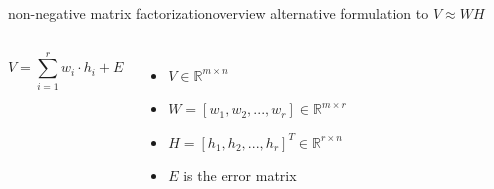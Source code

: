         \begin{frame}{non-negative matrix factorization}{overview}
           alternative formulation to $V \approx WH$
            \begin{columns}
                \begin{equation*}
                V = \sum_{i = 1}^r w_{i} \cdot h_{i} + E
                \end{equation*}
			    \begin{itemize}
					\item  $V \in \mathbb{R}^{m \times n}$
					\item  $W = [w_{1}, w_{2}, ..., w_{r}] \in \mathbb{R}^{m \times r}$
					\item  $H  = [h_{1}, h_{2}, ..., h_{r}]^{T} \in \mathbb{R}^{r \times n}$
					\item  $E$ is the error matrix													   
				\end{itemize}			                   
            \end{columns}
            \begin{figure}
                
            \end{figure}
        \end{frame}        
        
